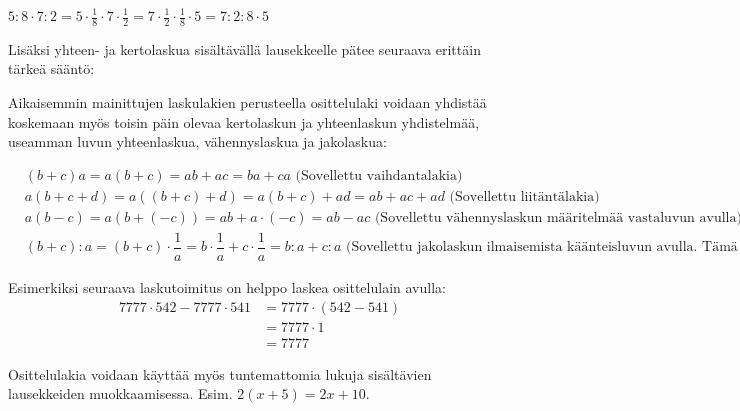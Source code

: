 \begin{esimerkki}
$5:8\cdot 7:2=5\cdot\frac18\cdot 7\cdot\frac12=7\cdot \frac12\cdot\frac18\cdot 5=7:2:8\cdot 5$
\end{esimerkki} 

Lisäksi yhteen- ja kertolaskua sisältävällä lausekkeelle pätee seuraava erittäin tärkeä sääntö:


Aikaisemmin mainittujen laskulakien perusteella osittelulaki voidaan yhdistää koskemaan myös toisin päin olevaa kertolaskun ja yhteenlaskun yhdistelmää, useamman luvun yhteenlaskua, vähennyslaskua ja jakolaskua:

\begin{align*}
&(b+c)a = a(b+c) = ab+ac = ba+ca \text{ (Sovellettu vaihdantalakia)} \\
&a(b+c+d) = a((b+c)+d) = a(b+c)+ad = ab+ac+ad \text{ (Sovellettu liitäntälakia)} \\
&a(b-c) = a(b+(-c))=ab+a\cdot(-c)=ab-ac \text{ (Sovellettu vähennyslaskun määritelmää vastaluvun avulla)} \\
&(b+c):a = (b+c)\cdot\dfrac1a = b\cdot\dfrac1a+c\cdot\dfrac1a = b:a+c:a \text{ (Sovellettu jakolaskun ilmaisemista käänteisluvun avulla. Tämä ominaisuus esitellään myöhemmin rationaalilukujen yhteydessä.) }
\end{align*}

Esimerkiksi seuraava laskutoimitus on helppo laskea osittelulain avulla: 
     \begin{align*}
	  7777\cdot 542-7777\cdot 541 &= 7777\cdot (542-541)  \\ &= 7777\cdot 1 \\ &= 7777
     \end{align*}


Osittelulakia voidaan käyttää myös tuntemattomia lukuja sisältävien lausekkeiden muokkaamisessa. Esim. $2(x+5)=2x+10$.
    

